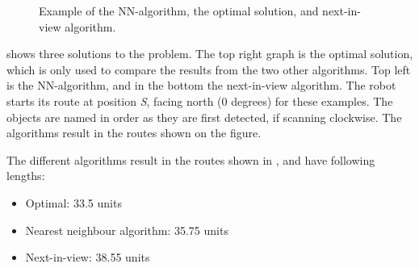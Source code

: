 \begin{figure}[H]
     \caption{\label{fig:algorithm-example} Example of the NN-algorithm, the optimal solution, and next-in-view algorithm.}
\end{figure}

 shows three solutions to the problem. The top right graph is the optimal solution, which is only used to compare the results from the two other algorithms. Top left is the NN-algorithm, and in the bottom the next-in-view algorithm. The robot starts its route at position \emph{S}, facing north (0 degrees) for these examples. The objects are named in order as they are first detected, if scanning clockwise. The algorithms result in the routes shown on the figure.

The different algorithms result in the routes shown in , and have following lengths:
\begin{itemize}
\item Optimal: 33.5 units
\item Nearest neighbour algorithm: 35.75 units
\item Next-in-view: 38.55 units
\end{itemize}


